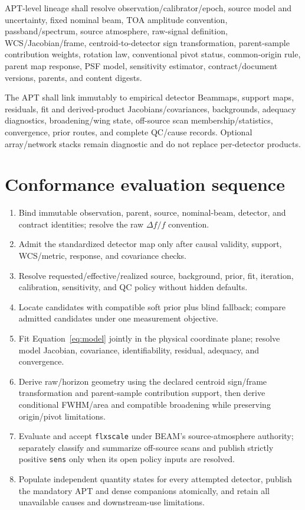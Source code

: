 \documentclass[10pt]{article}
\begin{document}
APT-level lineage shall resolve observation/calibrator/epoch, source model and
uncertainty, fixed nominal beam, TOA amplitude convention, passband/spectrum,
source atmosphere, raw-signal definition, WCS/Jacobian/frame,
centroid-to-detector sign transformation, parent-sample contribution weights,
rotation law, conventional pivot status, common-origin rule, parent map response, PSF model,
sensitivity estimator, contract/document versions, parents, and content
digests.

The APT shall link immutably to empirical detector Beammaps, support maps,
residuals, fit and derived-product Jacobians/covariances, backgrounds, adequacy diagnostics,
broadening/wing state, off-source scan membership/statistics, convergence,
prior routes, and complete QC/cause records. Optional array/network stacks
remain diagnostic and do not replace per-detector products.

\section{Conformance evaluation sequence}

\begin{enumerate}[label=\textbf{E\arabic*.}]
\item Bind immutable observation, parent, source, nominal-beam, detector, and
contract identities; resolve the raw $\Delta f/f$ convention.
\item Admit the standardized detector map only after causal validity, support,
WCS/metric, response, and covariance checks.
\item Resolve requested/effective/realized source, background, prior, fit,
iteration, calibration, sensitivity, and QC policy without hidden defaults.
\item Locate candidates with compatible soft prior plus blind fallback; compare
admitted candidates under one measurement objective.
\item Fit Equation~\ref{eq:model} jointly in the physical coordinate plane;
resolve model Jacobian, covariance, identifiability, residual, adequacy, and
convergence.
\item Derive raw/horizon geometry using the declared centroid sign/frame
transformation and parent-sample contribution support, then derive conditional
FWHM/area and compatible broadening while preserving origin/pivot limitations.
\item Evaluate and accept \texttt{flxscale} under BEAM's source-atmosphere
authority; separately classify and summarize off-source scans and publish
strictly positive \texttt{sens} only when its open policy inputs are resolved.
\item Populate independent quantity states for every attempted detector,
publish the mandatory APT and dense companions atomically, and retain all
unavailable causes and downstream-use limitations.
\end{enumerate}
\end{document}
